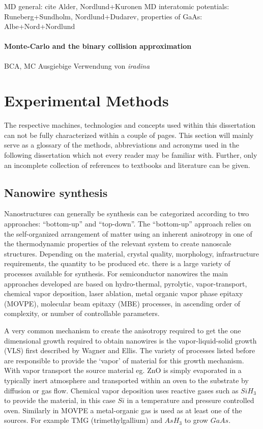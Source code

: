 MD general: cite Alder, Nordlund+Kuronen
MD interatomic potentials: Runeberg+Sundholm, Nordlund+Dudarev, 
properties of GaAs: Albe+Nord+Nordlund

\subsubsection{Monte-Carlo and the binary collision approximation}

BCA, MC
Ausgiebige Verwendung von \emph{iradina} \cite{borschel_ion_2011}


\chapter{Experimental Methods}

The respective machines, technologies and concepts used within this dissertation can not be fully characterized within a couple of pages. This section will mainly serve as a glossary of the methods, abbreviations and acronyms used in the following dissertation which not every reader may be familiar with. Further, only an incomplete collection of references to textbooks and literature can be given. 

\section{Nanowire synthesis}

Nanostructures can generally be synthesis can be categorized according to two approaches: ``bottom-up'' and ``top-down''. The ``bottom-up'' approach relies on the self-organized arrangement of matter using an inherent anisotropy in one of the thermodynamic properties of the relevant system to create nanoscale structures. Depending on the material, crystal quality, morphology, infrastructure requirements, the quantity to be produced etc. there is a large variety of processes available for synthesis. For semiconductor nanowires the main approaches developed are based on hydro-thermal, pyrolytic, vapor-transport, chemical vapor deposition, laser ablation, metal organic vapor phase epitaxy (MOVPE), molecular beam epitaxy (MBE) processes, in ascending order of complexity, or number of controllable parameters. 

A very common mechanism to create the anisotropy required to get the one dimensional growth required to obtain nanowires is the vapor-liquid-solid growth (VLS) first described by Wagner and Ellis. The variety of processes listed before are responsible to provide the `vapor' of material for this growth mechanism. With vapor transport the source material eg. ZnO is simply evaporated in a typically inert atmosphere and transported within an oven to the substrate by diffusion or gas flow. Chemical vapor deposition uses reactive gases such as $SiH_3$ to provide the material, in this case $Si$ in a temperature and pressure controlled oven. Similarly in MOVPE a metal-organic gas is used as at least one of the sources. For example TMG (trimethylgallium) and $AsH_3$ to grow $GaAs$.

